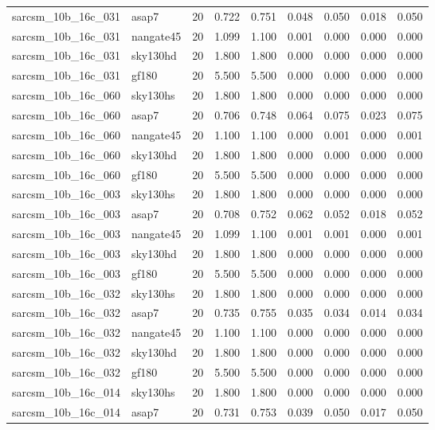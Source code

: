 \begin{tabular}{llrrrrrrr}
sarcsm\_10b\_16c\_031 & asap7 & 20 & 0.722 & 0.751 & 0.048 & 0.050 & 0.018 & 0.050 \\
sarcsm\_10b\_16c\_031 & nangate45 & 20 & 1.099 & 1.100 & 0.001 & 0.000 & 0.000 & 0.000 \\
sarcsm\_10b\_16c\_031 & sky130hd & 20 & 1.800 & 1.800 & 0.000 & 0.000 & 0.000 & 0.000 \\
sarcsm\_10b\_16c\_031 & gf180 & 20 & 5.500 & 5.500 & 0.000 & 0.000 & 0.000 & 0.000 \\
sarcsm\_10b\_16c\_060 & sky130hs & 20 & 1.800 & 1.800 & 0.000 & 0.000 & 0.000 & 0.000 \\
sarcsm\_10b\_16c\_060 & asap7 & 20 & 0.706 & 0.748 & 0.064 & 0.075 & 0.023 & 0.075 \\
sarcsm\_10b\_16c\_060 & nangate45 & 20 & 1.100 & 1.100 & 0.000 & 0.001 & 0.000 & 0.001 \\
sarcsm\_10b\_16c\_060 & sky130hd & 20 & 1.800 & 1.800 & 0.000 & 0.000 & 0.000 & 0.000 \\
sarcsm\_10b\_16c\_060 & gf180 & 20 & 5.500 & 5.500 & 0.000 & 0.000 & 0.000 & 0.000 \\
sarcsm\_10b\_16c\_003 & sky130hs & 20 & 1.800 & 1.800 & 0.000 & 0.000 & 0.000 & 0.000 \\
sarcsm\_10b\_16c\_003 & asap7 & 20 & 0.708 & 0.752 & 0.062 & 0.052 & 0.018 & 0.052 \\
sarcsm\_10b\_16c\_003 & nangate45 & 20 & 1.099 & 1.100 & 0.001 & 0.001 & 0.000 & 0.001 \\
sarcsm\_10b\_16c\_003 & sky130hd & 20 & 1.800 & 1.800 & 0.000 & 0.000 & 0.000 & 0.000 \\
sarcsm\_10b\_16c\_003 & gf180 & 20 & 5.500 & 5.500 & 0.000 & 0.000 & 0.000 & 0.000 \\
sarcsm\_10b\_16c\_032 & sky130hs & 20 & 1.800 & 1.800 & 0.000 & 0.000 & 0.000 & 0.000 \\
sarcsm\_10b\_16c\_032 & asap7 & 20 & 0.735 & 0.755 & 0.035 & 0.034 & 0.014 & 0.034 \\
sarcsm\_10b\_16c\_032 & nangate45 & 20 & 1.100 & 1.100 & 0.000 & 0.000 & 0.000 & 0.000 \\
sarcsm\_10b\_16c\_032 & sky130hd & 20 & 1.800 & 1.800 & 0.000 & 0.000 & 0.000 & 0.000 \\
sarcsm\_10b\_16c\_032 & gf180 & 20 & 5.500 & 5.500 & 0.000 & 0.000 & 0.000 & 0.000 \\
sarcsm\_10b\_16c\_014 & sky130hs & 20 & 1.800 & 1.800 & 0.000 & 0.000 & 0.000 & 0.000 \\
sarcsm\_10b\_16c\_014 & asap7 & 20 & 0.731 & 0.753 & 0.039 & 0.050 & 0.017 & 0.050 \\

\end{tabular}
